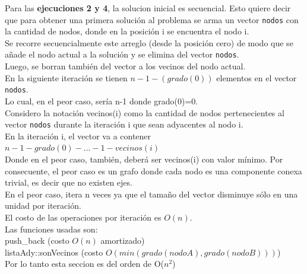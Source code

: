 \bigskip

Para las \textbf{ejecuciones 2 y 4}, la solucion inicial es secuencial. Esto quiere decir que para obtener una primera soluci\'on al problema se arma un vector \texttt{nodos} con la cantidad de nodos, donde en la posici\'on i se encuentra el nodo i.\\

Se recorre secuencialmente este arreglo (desde la posici\'on cero) de modo que se a\~nade el nodo actual a la soluci\'on y se elimina del vector \texttt{nodos}.\\

Luego, se borran tambi\'en del vector a los vecinos del nodo actual.\\

En la siguiente iteraci\'on se tienen $n-1-(grado(0))$ elementos en el vector \texttt{nodos}.\\

Lo cual, en el peor caso, ser\'ia n-1 donde grado(0)=0.\\

Considero la notaci\'on vecinos(i) como la cantidad de nodos pertenecientes al vector \texttt{nodos} durante la iteraci\'on i que sean adyacentes al nodo i.\\

En la iteraci\'on i, el vector va a contener $n-1-grado(0)- ... -1-vecinos(i)$\\

Donde en el peor caso, tambi\'en, deber\'a ser vecinos(i) con valor m\'inimo. Por consecuente, el peor caso es un grafo donde cada nodo es una componente conexa trivial, es decir que no existen ejes.\\
	
En el peor caso, itera n veces ya que el tama\~no del vector disminuye s\'olo en una unidad por iteraci\'on.\\

El costo de las operaciones por iteraci\'on es $O(n)$.\\

Las funciones usadas son:\\

push_back (costo $O(n)$ amortizado)\\

listaAdy::sonVecinos (costo $O(min(grado(nodoA), grado(nodoB)))$)\\

Por lo tanto esta seccion es del orden de O($n^2$)

\bigskip

